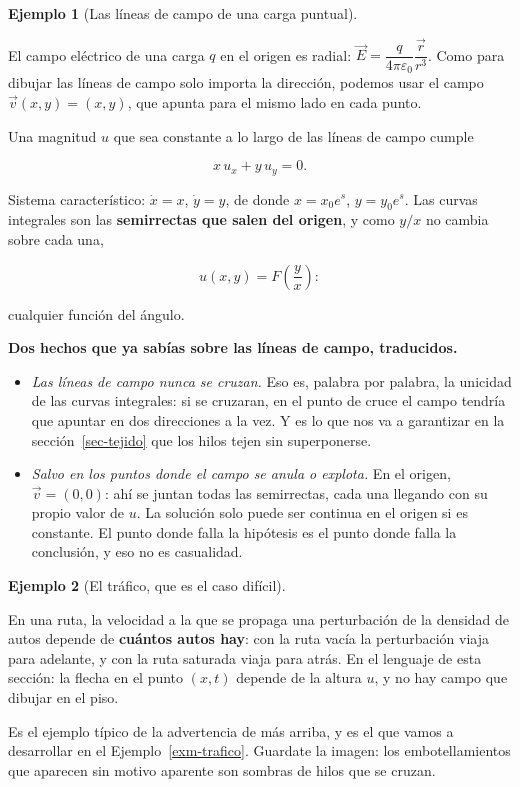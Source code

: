 \documentclass[
  spanish,
  a4paper,
]{scrbook}
\providecommand{\tightlist}{%
  \setlength{\itemsep}{0pt}\setlength{\parskip}{0pt}}
\theoremstyle{definition}
\theoremstyle{plain}
\theoremstyle{definition}
\newtheorem{example}{Ejemplo}[chapter]
\theoremstyle{plain}
\theoremstyle{definition}
\theoremstyle{remark}
\begin{document}
\begin{example}[Las líneas de campo de una carga
puntual]\protect\hypertarget{exm-campo-electrico}{}\label{exm-campo-electrico}

El campo eléctrico de una carga \(q\) en el origen es radial:
\(\vec E = \dfrac{q}{4\pi\varepsilon_0}\dfrac{\vec r}{r^{3}}\). Como
para dibujar las líneas de campo solo importa la dirección, podemos usar
el campo \(\vec v(x,y) = (x, y)\), que apunta para el mismo lado en cada
punto.

Una magnitud \(u\) que sea constante a lo largo de las líneas de campo
cumple

\[
x\,u_x + y\,u_y = 0 .
\]

Sistema característico: \(\dot x = x\), \(\dot y = y\), de donde
\(x = x_0e^{s}\), \(y = y_0e^{s}\). Las curvas integrales son las
\textbf{semirrectas que salen del origen}, y como \(y/x\) no cambia
sobre cada una,

\[
u(x,y) = F\!\left(\frac{y}{x}\right) :
\]

cualquier función del ángulo.

\textbf{Dos hechos que ya sabías sobre las líneas de campo, traducidos.}

\begin{itemize}
\tightlist
\item
  \emph{Las líneas de campo nunca se cruzan.} Eso es, palabra por
  palabra, la unicidad de las curvas integrales: si se cruzaran, en el
  punto de cruce el campo tendría que apuntar en dos direcciones a la
  vez. Y es lo que nos va a garantizar en la sección~\ref{sec-tejido}
  que los hilos tejen sin superponerse.
\item
  \emph{Salvo en los puntos donde el campo se anula o explota.} En el
  origen, \(\vec v = (0,0)\): ahí se juntan todas las semirrectas, cada
  una llegando con su propio valor de \(u\). La solución solo puede ser
  continua en el origen si es constante. El punto donde falla la
  hipótesis es el punto donde falla la conclusión, y eso no es
  casualidad.
\end{itemize}

\end{example}

\begin{example}[El tráfico, que es el caso
difícil]\protect\hypertarget{exm-trafico-campo}{}\label{exm-trafico-campo}

En una ruta, la velocidad a la que se propaga una perturbación de la
densidad de autos depende de \textbf{cuántos autos hay}: con la ruta
vacía la perturbación viaja para adelante, y con la ruta saturada viaja
para atrás. En el lenguaje de esta sección: la flecha en el punto
\((x,t)\) depende de la altura \(u\), y no hay campo que dibujar en el
piso.

Es el ejemplo típico de la advertencia de más arriba, y es el que vamos
a desarrollar en el Ejemplo~\ref{exm-trafico}. Guardate la imagen: los
embotellamientos que aparecen sin motivo aparente son sombras de hilos
que se cruzan.

\end{example}
\end{document}
